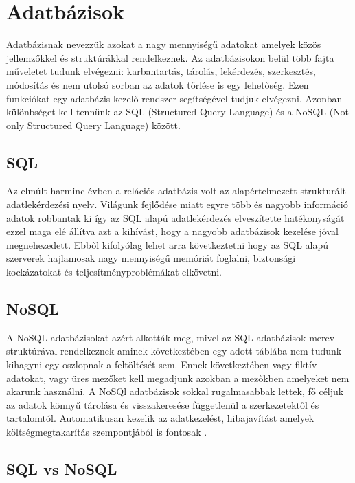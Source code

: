 \section{Adatbázisok}
Adatbázisnak nevezzük azokat a nagy mennyiségű adatokat amelyek közös jellemzőkkel és struktúrákkal rendelkeznek. Az adatbázisokon belül több fajta műveletet tudunk elvégezni: karbantartás, tárolás, lekérdezés, szerkesztés, módosítás és nem utolsó sorban az adatok törlése is egy lehetőség. Ezen funkciókat egy adatbázis kezelő rendszer segítségével tudjuk elvégezni.\cite{dbms} Azonban különbséget kell tennünk az SQL (Structured Query Language) és a NoSQL (Not only Structured Query Language) között.
\subsection{SQL}

Az elmúlt harminc évben a relációs adatbázis volt az alapértelmezett strukturált adatlekérdezési nyelv. Világunk fejlődése miatt egyre több és nagyobb információ adatok robbantak ki így az SQL alapú adatlekérdezés elveszítette hatékonyságát ezzel maga elé állítva azt a kihívást, hogy a nagyobb adatbázisok kezelése jóval megnehezedett. Ebből kifolyólag lehet arra következtetni hogy az SQL alapú szerverek hajlamosak nagy mennyiségű memóriát foglalni, biztonsági kockázatokat és teljesítményproblémákat elkövetni.\cite{venkatraman2016sql} 
	
\subsection{NoSQL}

A NoSQL adatbázisokat azért alkották meg, mivel az SQL adatbázisok merev struktúrával rendelkeznek aminek következtében egy adott táblába nem tudunk kihagyni egy oszlopnak a feltöltését sem. Ennek következtében vagy fiktív adatokat, vagy üres mezőket kell megadjunk azokban a mezőkben amelyeket nem akarunk használni. A NoSQl adatbázisok sokkal rugalmasabbak lettek, fő céljuk az adatok könnyű tárolása és visszakeresése függetlenül a szerkezetektől és tartalomtól. Automatikusan kezelik az adatkezelést, hibajavítást amelyek költségmegtakarítás szempontjából is fontosak \cite{venkatraman2016sql}.
	
\subsection{SQL vs NoSQL}

